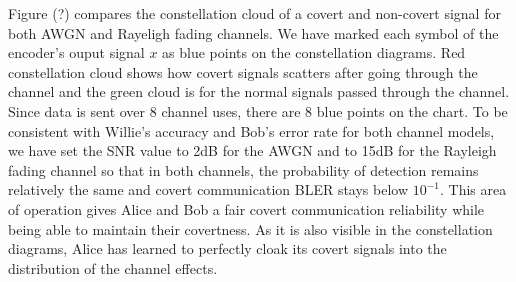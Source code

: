 Figure (?) compares the constellation cloud of a covert and non-covert signal for both AWGN and Rayeligh fading channels. We have marked each symbol of the encoder's ouput signal \(x\) as blue points on the constellation diagrams. Red constellation cloud shows how covert signals scatters after going through the channel and the green cloud is for the normal signals passed through the channel. Since data is sent over 8 channel uses, there are 8 blue points on the chart. To be consistent with Willie's accuracy and Bob's error rate for both channel models, we have set the SNR value to 2dB for the AWGN and to 15dB for the Rayleigh fading channel so that in both channels, the probability of detection remains relatively the same and covert communication BLER stays below \(10^{-1}\). This area of operation gives Alice and Bob a fair covert communication reliability while being able to maintain their covertness. As it is also visible in the constellation diagrams, Alice has learned to perfectly cloak its covert signals into the distribution of the channel effects.